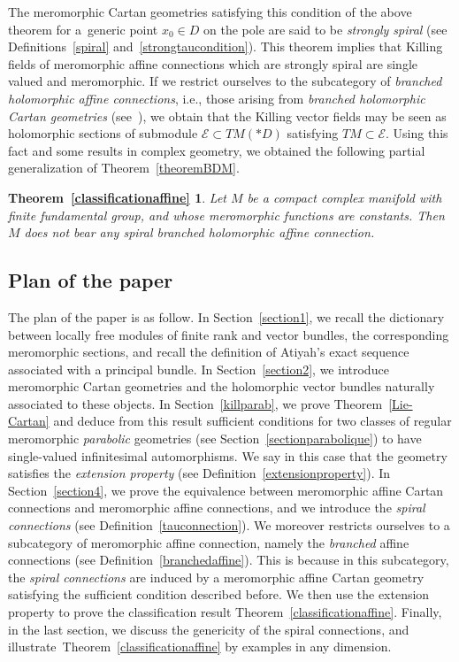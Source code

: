 \documentclass[pdftex]{sigma}
\numberwithin{equation}{section}
\newtheorem*{Theorem-5.11}{Theorem~\ref{classificationaffine}}
\begin{document}
 The meromorphic Cartan geometries satisfying this condition of the above theorem for a~generic point $x_0\in D$ on the pole are said to be \textit{strongly spiral} (see Definitions~\ref{spiral} and~\ref{strongtaucondition}). This theorem implies that Killing fields of meromorphic affine connections which are strongly spiral are single valued and meromorphic. If we restrict ourselves to the subcategory of \textit{branched holomorphic affine connections}, i.e., those arising from \textit{branched holomorphic Cartan geometries} (see~\cite{BD}), we obtain that the Killing vector fields may be seen as holomorphic sections of submodule $\mathcal{E}\subset TM(* D)$ satisfying $TM\subset \mathcal{E}$. Using this fact and some results in complex geometry, we obtained the following partial generalization of Theorem~\ref{theoremBDM}.

\begin{Theorem-5.11}\label{classificationaffine-Int} Let $M$ be a compact complex manifold with finite fundamental group, and whose meromorphic functions are constants. Then $M$ does not bear any spiral branched holomorphic affine connection.
\end{Theorem-5.11}

\subsection{Plan of the paper}
The plan of the paper is as follow. In Section~\ref{section1}, we recall the dictionary between locally free modules of finite rank and vector bundles, the corresponding meromorphic sections, and recall the definition of Atiyah's exact sequence associated with a principal bundle. In Section~\ref{section2}, we introduce meromorphic Cartan geometries and the holomorphic vector bundles naturally associated to these objects. In Section~\ref{killparab}, we prove Theorem~\ref{Lie-Cartan} and deduce from this result sufficient conditions for two classes of regular meromorphic \textit{parabolic} geometries (see Section~\ref{sectionparabolique}) to have single-valued infinitesimal automorphisms. We say in this case that the geometry satisfies the \textit{extension property} (see Definition~\ref{extensionproperty}). In Section~\ref{section4}, we prove the equivalence between meromorphic affine Cartan connections and meromorphic affine connections, and we introduce the \textit{spiral connections} (see Definition~\ref{tauconnection}). We moreover restricts ourselves to a subcategory of meromorphic affine connection, namely the \textit{branched} affine connections (see Definition~\ref{branchedaffine}). This is because in this subcategory, the \textit{spiral connections} are induced by a meromorphic affine Cartan geometry satisfying the sufficient condition described before. We then use the extension property to prove the classification result Theorem~\ref{classificationaffine}. Finally, in the last section, we discuss the genericity of the spiral connections, and illustrate~Theorem~\ref{classificationaffine} by examples in any dimension.
\end{document}
